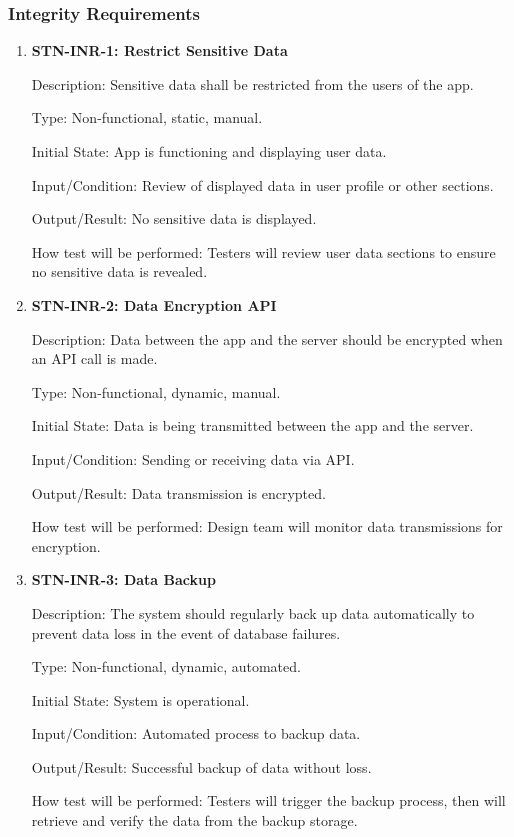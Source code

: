 \documentclass[12pt, titlepage]{article}
\begin{document}
\subsubsection{Integrity Requirements}

\begin{enumerate}

\item {\textbf{STN-INR-1: Restrict Sensitive Data}}

Description: Sensitive data shall be restricted from the users of the app. 

Type: Non-functional, static, manual.

Initial State: App is functioning and displaying user data.

Input/Condition: Review of displayed data in user profile or other sections.

Output/Result: No sensitive data is displayed.

How test will be performed: Testers will review user data sections to ensure no sensitive data is revealed.

\item{\textbf{STN-INR-2: Data Encryption API}}

Description:  Data between the app and the server should be encrypted when an API call is made.

Type: Non-functional, dynamic, manual.

Initial State: Data is being transmitted between the app and the server.

Input/Condition: Sending or receiving data via API.

Output/Result: Data transmission is encrypted.

How test will be performed: Design team will monitor data transmissions for encryption.


\item \textbf{{STN-INR-3: Data Backup}}

Description: The system should regularly back up data automatically to prevent data loss in the event of database failures.

Type: Non-functional, dynamic, automated.

Initial State: System is operational.

Input/Condition: Automated process to backup data.

Output/Result: Successful backup of data without loss.

How test will be performed: Testers will trigger the backup process, then will retrieve and verify the data from the backup storage.


\end{enumerate}
\end{document}
